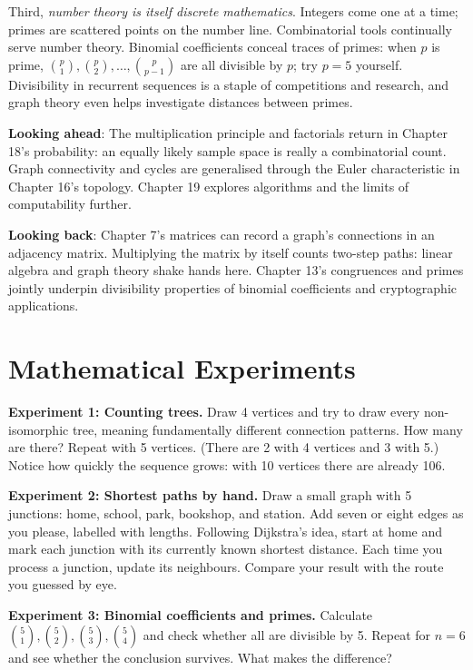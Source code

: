 Third, \emph{number theory is itself discrete mathematics}. Integers come one at a time; primes are scattered points on the number line. Combinatorial tools continually serve number theory. Binomial coefficients conceal traces of primes: when $p$ is prime, $\binom{p}{1},\binom{p}{2},\dots,\binom{p}{p-1}$ are all divisible by $p$; try $p=5$ yourself. Divisibility in recurrent sequences is a staple of competitions and research, and graph theory even helps investigate distances between primes.

\begin{lianjie}
\textbf{Looking ahead}: The multiplication principle and factorials return in Chapter 18's probability: an equally likely sample space is really a combinatorial count. Graph connectivity and cycles are generalised through the Euler characteristic in Chapter 16's topology. Chapter 19 explores algorithms and the limits of computability further.

\textbf{Looking back}: Chapter 7's matrices can record a graph's connections in an adjacency matrix. Multiplying the matrix by itself counts two-step paths: linear algebra and graph theory shake hands here. Chapter 13's congruences and primes jointly underpin divisibility properties of binomial coefficients and cryptographic applications.
\end{lianjie}

\section{Mathematical Experiments}

\begin{shiyan}
\textbf{Experiment 1: Counting trees.} Draw 4 vertices and try to draw every non-isomorphic tree, meaning fundamentally different connection patterns. How many are there? Repeat with 5 vertices. (There are 2 with 4 vertices and 3 with 5.) Notice how quickly the sequence grows: with 10 vertices there are already 106.

\textbf{Experiment 2: Shortest paths by hand.} Draw a small graph with 5 junctions: home, school, park, bookshop, and station. Add seven or eight edges as you please, labelled with lengths. Following Dijkstra's idea, start at home and mark each junction with its currently known shortest distance. Each time you process a junction, update its neighbours. Compare your result with the route you guessed by eye.

\textbf{Experiment 3: Binomial coefficients and primes.} Calculate $\binom{5}{1},\binom{5}{2},\binom{5}{3},\binom{5}{4}$ and check whether all are divisible by 5. Repeat for $n=6$ and see whether the conclusion survives. What makes the difference?
\end{shiyan}

